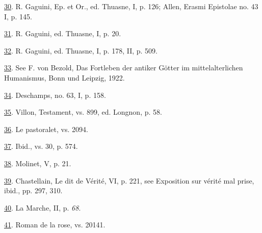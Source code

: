 \protect\hypertarget{23_NOTES.xhtmlux5cux23id_65}{\protect\hyperlink{22_Chapter_Fourteen__THE_COMING_OF.xhtmlux5cux23id_64}{30}}.
R. Gaguini, Ep. et Or., ed. Thuasne, I, p. 126; Allen, Erasmi Epistolae
no. 43 I, p. 145.

\protect\hypertarget{23_NOTES.xhtmlux5cux23id_63}{\protect\hyperlink{22_Chapter_Fourteen__THE_COMING_OF.xhtmlux5cux23id_62}{31}}.
R. Gaguini, ed. Thuasne, I, p. 20.

\protect\hypertarget{23_NOTES.xhtmlux5cux23id_61}{\protect\hyperlink{22_Chapter_Fourteen__THE_COMING_OF.xhtmlux5cux23id_60}{32}}.
R. Gaguini, ed. Thuasne, I, p. 178, II, p. 509.

\protect\hypertarget{23_NOTES.xhtmlux5cux23page_440}{\protect\hyperlink{22_Chapter_Fourteen__THE_COMING_OF.xhtmlux5cux23id_59}{33}}.
See F. von Bezold, Das Fortleben der antiker Götter im mittelalterlichen
Humanismus, Bonn und Leipzig, 1922.

\protect\hypertarget{23_NOTES.xhtmlux5cux23id_58}{\protect\hyperlink{22_Chapter_Fourteen__THE_COMING_OF.xhtmlux5cux23id_57}{34}}.
Deschamps, no. 63, I, p. 158.

\protect\hypertarget{23_NOTES.xhtmlux5cux23id_56}{\protect\hyperlink{22_Chapter_Fourteen__THE_COMING_OF.xhtmlux5cux23id_55}{35}}.
Villon, Testament, vs. 899, ed. Longnon, p. 58.

\protect\hypertarget{23_NOTES.xhtmlux5cux23id_54}{\protect\hyperlink{22_Chapter_Fourteen__THE_COMING_OF.xhtmlux5cux23id_53}{36}}.
Le pastoralet, vs. 2094.

\protect\hypertarget{23_NOTES.xhtmlux5cux23id_52}{\protect\hyperlink{22_Chapter_Fourteen__THE_COMING_OF.xhtmlux5cux23id_51}{37}}.
Ibid., vs. 30, p. 574.

\protect\hypertarget{23_NOTES.xhtmlux5cux23id_50}{\protect\hyperlink{22_Chapter_Fourteen__THE_COMING_OF.xhtmlux5cux23id_49}{38}}.
Molinet, V, p. 21.

\protect\hypertarget{23_NOTES.xhtmlux5cux23id_48}{\protect\hyperlink{22_Chapter_Fourteen__THE_COMING_OF.xhtmlux5cux23id_47}{39}}.
Chastellain, Le dit de Vérité, VI, p. 221, see Exposition sur vérité mal
prise, ibid., pp. 297, 310.

\protect\hypertarget{23_NOTES.xhtmlux5cux23id_46}{\protect\hyperlink{22_Chapter_Fourteen__THE_COMING_OF.xhtmlux5cux23id_45}{40}}.
La Marche, II, p. \emph{68}.

\protect\hypertarget{23_NOTES.xhtmlux5cux23id_44}{\protect\hyperlink{22_Chapter_Fourteen__THE_COMING_OF.xhtmlux5cux23id_43}{41}}.
Roman de la rose, vs. 20141.
